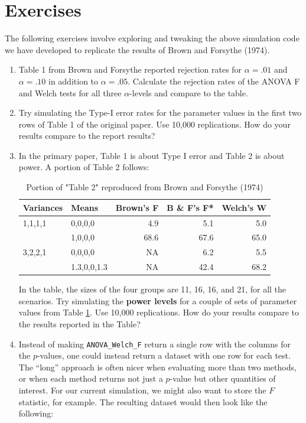 \documentclass[
]{book}
\begin{document}
\section{Exercises}\label{exAnovaExercises}

The following exercises involve exploring and tweaking the above simulation code we have developed to replicate the results of Brown and Forsythe (1974).

\begin{enumerate}
\def\labelenumi{\arabic{enumi}.}
\item
  Table 1 from Brown and Forsythe reported rejection rates for \(\alpha = .01\) and \(\alpha = .10\) in addition to \(\alpha = .05\). Calculate the rejection rates of the ANOVA F and Welch tests for all three \(\alpha\)-levels and compare to the table.
\item
  Try simulating the Type-I error rates for the parameter values in the first two rows of Table 1 of the original paper. Use 10,000 replications. How do your results compare to the report results?
\item
  In the primary paper, Table 1 is about Type I error and Table 2 is about power. A portion of Table 2 follows:

  \begin{table}

   \caption{\label{tab:BF-power}Portion of "Table 2" reproduced from Brown and Forsythe (1974)}
   \centering
   \begin{tabular}[t]{l|l|r|r|r}
   \hline
   Variances & Means & Brown's F & B \& F's F* & Welch's W\\
   \hline
   1,1,1,1 & 0,0,0,0 & 4.9 & 5.1 & 5.0\\
   \hline
    & 1,0,0,0 & 68.6 & 67.6 & 65.0\\
   \hline
   3,2,2,1 & 0,0,0,0 & NA & 6.2 & 5.5\\
   \hline
    & 1.3,0,0,1.3 & NA & 42.4 & 68.2\\
   \hline
   \end{tabular}
   \end{table}

  In the table, the sizes of the four groups are 11, 16, 16, and 21, for all the scenarios.
  Try simulating the \textbf{power levels} for a couple of sets of parameter values from Table \ref{tab:BF-power}.
  Use 10,000 replications.
  How do your results compare to the results reported in the Table?
\item
  Instead of making \texttt{ANOVA\_Welch\_F} return a single row with the columns for the \(p\)-values, one could instead return a dataset with one row for each test. The ``long'' approach is often nicer when evaluating more than two methods, or when each method returns not just a \(p\)-value but other quantities of interest. For our current simulation, we might also want to store the \(F\) statistic, for example. The resulting dataset would then look like the following:


\end{enumerate}
\end{document}
